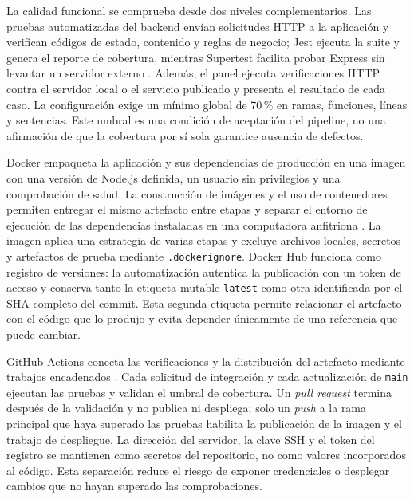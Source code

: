 \documentclass[12pt,letterpaper]{article}
\begin{document}
La calidad funcional se comprueba desde dos niveles complementarios. Las pruebas automatizadas del backend envían solicitudes HTTP a la aplicación y verifican códigos de estado, contenido y reglas de negocio; Jest ejecuta la suite y genera el reporte de cobertura, mientras Supertest facilita probar Express sin levantar un servidor externo \cite{jestdocs,supertestdocs}. Además, el panel ejecuta verificaciones HTTP contra el servidor local o el servicio publicado y presenta el resultado de cada caso. La configuración exige un mínimo global de 70\,\% en ramas, funciones, líneas y sentencias. Este umbral es una condición de aceptación del pipeline, no una afirmación de que la cobertura por sí sola garantice ausencia de defectos.

Docker empaqueta la aplicación y sus dependencias de producción en una imagen con una versión de Node.js definida, un usuario sin privilegios y una comprobación de salud. La construcción de imágenes y el uso de contenedores permiten entregar el mismo artefacto entre etapas y separar el entorno de ejecución de las dependencias instaladas en una computadora anfitriona \cite{dockerdocs}. La imagen aplica una estrategia de varias etapas y excluye archivos locales, secretos y artefactos de prueba mediante \texttt{.dockerignore}. Docker Hub funciona como registro de versiones: la automatización autentica la publicación con un token de acceso y conserva tanto la etiqueta mutable \texttt{latest} como otra identificada por el SHA completo del commit. Esta segunda etiqueta permite relacionar el artefacto con el código que lo produjo y evita depender únicamente de una referencia que puede cambiar.

GitHub Actions conecta las verificaciones y la distribución del artefacto mediante trabajos encadenados \cite{githubactions}. Cada solicitud de integración y cada actualización de \texttt{main} ejecutan las pruebas y validan el umbral de cobertura. Un \textit{pull request} termina después de la validación y no publica ni despliega; solo un \textit{push} a la rama principal que haya superado las pruebas habilita la publicación de la imagen y el trabajo de despliegue. La dirección del servidor, la clave SSH y el token del registro se mantienen como secretos del repositorio, no como valores incorporados al código. Esta separación reduce el riesgo de exponer credenciales o desplegar cambios que no hayan superado las comprobaciones.
\end{document}
